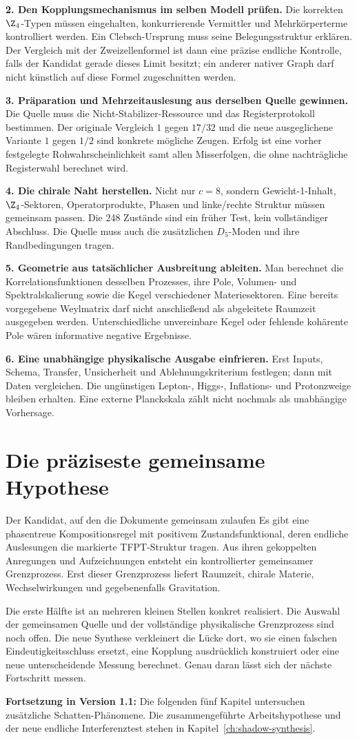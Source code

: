 \textbf{2. Den Kopplungsmechanismus im selben Modell prüfen.} Die korrekten $\Z_4$-Typen müssen eingehalten, konkurrierende Vermittler und Mehrkörperterme kontrolliert werden. Ein Clebsch-Ursprung muss seine Belegungsstruktur erklären. Der Vergleich mit der Zweizellenformel ist dann eine präzise endliche Kontrolle, falls der Kandidat gerade dieses Limit besitzt; ein anderer nativer Graph darf nicht künstlich auf diese Formel zugeschnitten werden.

\textbf{3. Präparation und Mehrzeitauslesung aus derselben Quelle gewinnen.} Die Quelle muss die Nicht-Stabilizer-Ressource und das Registerprotokoll bestimmen. Der originale Vergleich $1$ gegen $17/32$ und die neue ausgeglichene Variante $1$ gegen $1/2$ sind konkrete mögliche Zeugen. Erfolg ist eine vorher festgelegte Rohwahrscheinlichkeit samt allen Misserfolgen, die ohne nachträgliche Registerwahl berechnet wird.

\textbf{4. Die chirale Naht herstellen.} Nicht nur $c=8$, sondern Gewicht-1-Inhalt, $\Z_4$-Sektoren, Operatorprodukte, Phasen und linke/rechte Struktur müssen gemeinsam passen. Die 248 Zustände sind ein früher Test, kein vollständiger Abschluss. Die Quelle muss auch die zusätzlichen $D_5$-Moden und ihre Randbedingungen tragen.

\textbf{5. Geometrie aus tatsächlicher Ausbreitung ableiten.} Man berechnet die Korrelationsfunktionen desselben Prozesses, ihre Pole, Volumen- und Spektralskalierung sowie die Kegel verschiedener Materiesektoren. Eine bereits vorgegebene Weylmatrix darf nicht anschließend als abgeleitete Raumzeit ausgegeben werden. Unterschiedliche unvereinbare Kegel oder fehlende kohärente Pole wären informative negative Ergebnisse.

\textbf{6. Eine unabhängige physikalische Ausgabe einfrieren.} Erst Inputs, Schema, Transfer, Unsicherheit und Ablehnungskriterium festlegen; dann mit Daten vergleichen. Die ungünstigen Lepton-, Higgs-, Inflations- und Protonzweige bleiben erhalten. Eine externe Planckskala zählt nicht nochmals als unabhängige Vorhersage.

\section{Die präziseste gemeinsame Hypothese}
\begin{bild}{Der Kandidat, auf den die Dokumente gemeinsam zulaufen}
Es gibt eine phasentreue Kompositionsregel mit positivem Zustandsfunktional, deren endliche Auslesungen die markierte TFPT-Struktur tragen. Aus ihren gekoppelten Anregungen und Aufzeichnungen entsteht ein kontrollierter gemeinsamer Grenzprozess. Erst dieser Grenzprozess liefert Raumzeit, chirale Materie, Wechselwirkungen und gegebenenfalls Gravitation.
\end{bild}
Die erste Hälfte ist an mehreren kleinen Stellen konkret realisiert. Die Auswahl der gemeinsamen Quelle und der vollständige physikalische Grenzprozess sind noch offen. Die neue Synthese verkleinert die Lücke dort, wo sie einen falschen Eindeutigkeitsschluss ersetzt, eine Kopplung ausdrücklich konstruiert oder eine neue unterscheidende Messung berechnet. Genau daran lässt sich der nächste Fortschritt messen.

\par\noindent\textbf{Fortsetzung in Version 1.1:} Die folgenden fünf Kapitel untersuchen zusätzliche Schatten-Phänomene. Die zusammengeführte Arbeitshypothese und der neue endliche Interferenztest stehen in Kapitel~\ref{ch:shadow-synthesis}.
